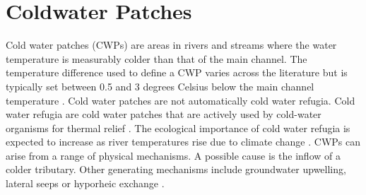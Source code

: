 
\section{Coldwater Patches}
\label{sec:cwp_definition}

Cold water patches (CWPs) are areas in rivers and streams where the water temperature is measurably colder than that of the main channel. The temperature difference used to define a CWP varies across the literature but is typically set between 0.5 and 3 degrees Celsius below the main channel temperature \citep{casas-mulet_unmanned_2020, wawrzyniak_effects_2016}. Cold water patches are not automatically cold water refugia. Cold water refugia are cold water patches that are actively used by cold-water organisms for thermal relief \citep{mejia_closing_2023}. The ecological importance of cold water refugia is expected to increase as river temperatures rise due to climate change \citep{kurylyk_preserving_2015}. CWPs can arise from a range of physical mechanisms. A possible  cause is the inflow of a colder tributary. Other generating mechanisms include groundwater upwelling, lateral seeps or hyporheic exchange \citep{mejia_closing_2023}.

